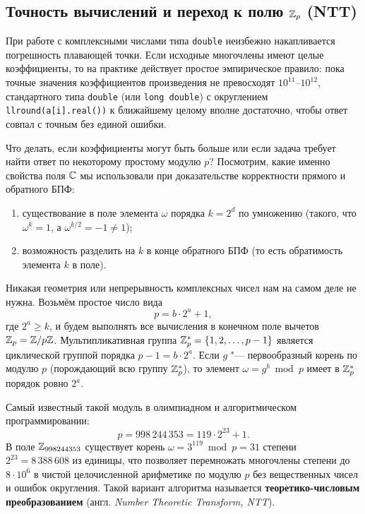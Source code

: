 \subsection{Точность вычислений и переход к полю \texorpdfstring{$\mathbb{Z}_p$}{Zp} (NTT)}

При работе с комплексными числами типа \texttt{double} неизбежно накапливается погрешность плавающей точки. Если исходные многочлены имеют целые коэффициенты, то на практике действует простое эмпирическое правило: пока точные значения коэффициентов произведения не превосходят $10^{11}\text{--}10^{12}$, стандартного типа \texttt{double} (или \texttt{long double}) с округлением \texttt{llround(a[i].real())} к ближайшему целому вполне достаточно, чтобы ответ совпал с точным без единой ошибки.

Что делать, если коэффициенты могут быть больше или если задача требует найти ответ по некоторому простому модулю $p$? Посмотрим, какие именно свойства поля $\mathbb{C}$ мы использовали при доказательстве корректности прямого и обратного БПФ:
\begin{enumerate}
    \item существование в поле элемента $\omega$ порядка $k = 2^d$ по умножению (такого, что $\omega^k = 1$, а $\omega^{k/2} = -1 \ne 1$);
    \item возможность разделить на $k$ в конце обратного БПФ (то есть обратимость элемента $k$ в поле).
\end{enumerate}

Никакая геометрия или непрерывность комплексных чисел нам на самом деле не нужна. Возьмём простое число вида
\[
    p = b \cdot 2^a + 1,
\]
где $2^a \ge k$, и будем выполнять все вычисления в конечном поле вычетов $\mathbb{Z}_p = \mathbb{Z} / p\mathbb{Z}$. Мультипликативная группа $\mathbb{Z}_p^* = \{1, 2, \dots, p - 1\}$ является циклической группой порядка $p - 1 = b \cdot 2^a$. Если $g$ "--- первообразный корень по модулю $p$ (порождающий всю группу $\mathbb{Z}_p^*$), то элемент $\omega = g^b \bmod p$ имеет в $\mathbb{Z}_p^*$ порядок ровно $2^a$.

Самый известный такой модуль в олимпиадном и алгоритмическом программировании:
\[
    p = 998\,244\,353 = 119 \cdot 2^{23} + 1.
\]
В поле $\mathbb{Z}_{998244353}$ существует корень $\omega = 3^{119} \bmod p = 31$ степени $2^{23} = 8\,388\,608$ из единицы, что позволяет перемножать многочлены степени до $8 \cdot 10^6$ в чистой целочисленной арифметике по модулю $p$ без вещественных чисел и ошибок округления. Такой вариант алгоритма называется \textbf{теоретико-числовым преобразованием} (англ. \textit{Number Theoretic Transform, NTT}).

